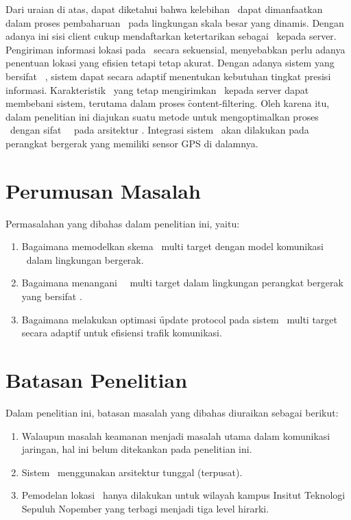 Dari uraian di atas, dapat diketahui bahwa kelebihan \pubsub~dapat dimanfaatkan
dalam proses pembaharuan \tracking~pada lingkungan skala besar yang dinamis.
Dengan adanya ini sisi client cukup mendaftarkan ketertarikan sebagai
\event~kepada server. Pengiriman informasi lokasi pada \tracking~secara
sekuensial, menyebabkan perlu adanya penentuan lokasi yang efisien tetapi tetap
akurat. Dengan adanya sistem yang bersifat \context~\aware, sistem dapat secara
adaptif menentukan kebutuhan tingkat presisi informasi. Karakteristik
\publisher~yang tetap mengirimkan \event~kepada server dapat membebani sistem,
terutama dalam proses \f{content-filtering}. Oleh karena itu, dalam penelitian
ini diajukan suatu metode untuk mengoptimalkan proses \tracking~dengan sifat
\context~\aware~pada arsitektur \pubsub.  Integrasi sistem \tracking~akan
dilakukan pada perangkat bergerak yang memiliki sensor GPS di dalamnya.


\section{Perumusan Masalah}

Permasalahan yang dibahas dalam penelitian ini, yaitu:

\begin{enumerate}
  \item Bagaimana memodelkan skema \tracking~multi target dengan model komunikasi
    \pubsub~dalam lingkungan bergerak.
  \item Bagaimana menangani \query~\tracking~multi target dalam lingkungan
    perangkat bergerak yang bersifat \unreliable.
  \item Bagaimana melakukan optimasi \f{update protocol} pada sistem
    \tracking~multi target secara adaptif untuk efisiensi trafik komunikasi.
\end{enumerate}


\section{Batasan Penelitian}

Dalam penelitian ini, batasan masalah yang dibahas diuraikan sebagai berikut:

\begin{enumerate}
  \item Walaupun masalah keamanan menjadi masalah utama dalam
    komunikasi jaringan, hal ini belum ditekankan pada penelitian ini.
  \item Sistem \PubSub~menggunakan arsitektur tunggal (terpusat).
  \item Pemodelan lokasi \tracking~hanya dilakukan untuk wilayah kampus Insitut
    Teknologi Sepuluh Nopember yang terbagi menjadi tiga level hirarki.
\end{enumerate}

